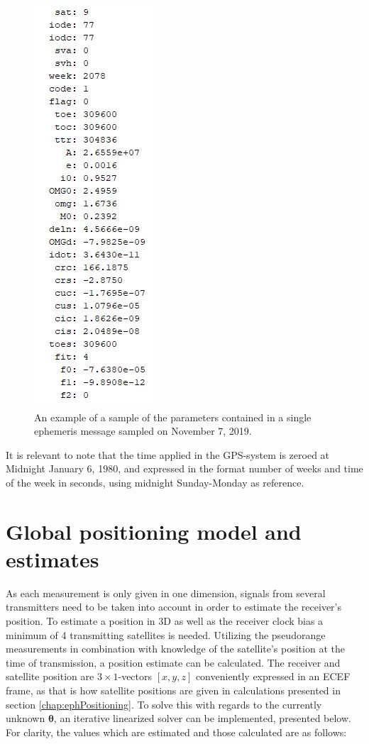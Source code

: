 \begin{figure}[!h]
\includegraphics[scale=1]{Background/eph_values.jpg}
\caption{\label{fig:ephData} An example of a sample of the parameters contained in a single ephemeris message sampled on November 7, 2019.}
\end{figure}
\par 
It is relevant to note that the time applied in the GPS-system is zeroed at Midnight January 6, 1980, and expressed in the format number of weeks and time of the week in seconds, using midnight Sunday-Monday as reference.

\section{Global positioning model and estimates}
As each measurement is only given in one dimension, signals from several transmitters need to be taken into account in order to estimate the receiver's position. To estimate a position in 3D as well as the receiver clock bias a minimum of 4 transmitting satellites is needed. Utilizing the pseudorange measurements in combination with knowledge of the satellite's position at the time of transmission, a position estimate can be calculated. The receiver and satellite position are $3\times 1$-vectors $[x, y, z]$ conveniently expressed in an ECEF frame, as that is how satellite positions are given in calculations presented in section \ref{chap:ephPositioning}. To solve this with regards to the currently unknown $\boldsymbol \theta$, an iterative linearized solver can be implemented, presented below. For clarity, the values which are estimated and those calculated are as follows:

